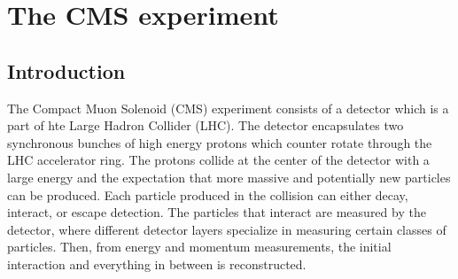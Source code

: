 \setcounter{secnumdepth}{3}
\setcounter{tocdepth}{3}
\setlength{\parskip}{\smallskipamount}
\setlength{\parindent}{0pt}


\makeatletter


\providecommand{\tabularnewline}{\\}


\makeatother


\chapter{The CMS experiment}

\section{Introduction} The Compact Muon Solenoid (CMS) experiment consists of a detector which is a part of hte Large Hadron Collider (LHC). The detector encapsulates two synchronous bunches of high energy protons  which counter rotate through the LHC accelerator ring.  The protons collide at the center of the detector with a large energy and the expectation that more massive and potentially new particles can be produced. Each particle produced in the collision can either decay, interact, or escape detection. The particles that interact are measured by the detector, where different detector layers specialize in measuring certain classes of particles. Then, from energy and momentum measurements, the initial interaction and everything in between is reconstructed.   



